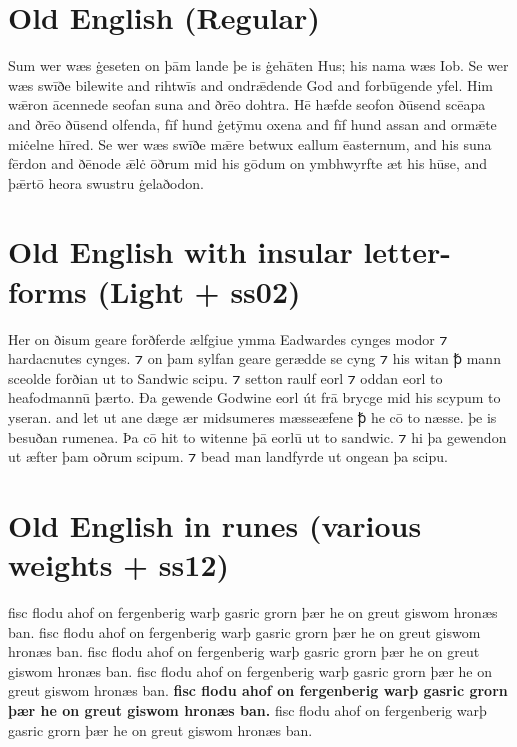 \documentclass[12pt,letterpaper,openany]{book}
\begin{document}
\section{Old English (Regular)}

{\large Sum wer wæs ġeseten on þām lande þe is ġehāten Hus; his nama wæs Iob. Se wer wæs swīðe bilewite and rihtwīs and ondrǣdende God and forbūgende yfel. Him wǣron ācennede seofan suna and ðrēo dohtra. Hē hæfde seofon ðūsend scēapa and ðrēo ðūsend olfenda, fīf hund ġetȳmu oxena and fīf hund assan and ormǣte miċelne hīred. Se wer wæs swīðe mǣre betwux eallum ēasternum, and his suna fērdon and ðēnode ǣlċ ōðrum mid his gōdum on ymbhwyrfte æt his hūse, and þǣrtō heora swustru ġelaðodon.}

\section{Old English with insular letter-forms (Light + ss02)}

{\large\light{}Her on ðisum geare forðferde ælfgiue ymma Eadwardes cynges modor ⁊ hardacnutes cynges. ⁊ on þam sylfan geare gerædde se cyng ⁊ his witan ꝥ mann sceolde forðian ut to Sandwic scipu. ⁊ setton raulf eorl ⁊ oddan eorl to heafodmannū þærto. Ða gewende Godwine eorl út frā brycge mid his scypum to yseran. and let ut ane dæge ær midsumeres mæsseæfene ꝥ he cō to næsse. þe is besuðan rumenea. Þa cō hit to witenne þā eorlū ut to sandwic. ⁊ hi þa gewendon ut æfter þam oðrum scipum. ⁊ bead man landfyrde ut ongean þa scipu.}

\section{Old English in runes (various weights + ss12)}

{\extralight{} fisc flodu ahof on fergenberig warþ gasric grorn þær he on greut giswom hronæs ban.
\light{} fisc flodu ahof on fergenberig warþ gasric grorn þær he on greut giswom hronæs ban.
\medium{} fisc flodu ahof on fergenberig warþ gasric grorn þær he on greut giswom hronæs ban.
\semibold{} fisc flodu ahof on fergenberig warþ gasric grorn þær he on greut giswom hronæs ban.
\textbf{fisc flodu ahof on fergenberig warþ gasric grorn þær he on greut giswom hronæs ban.}
\extrabold{} fisc flodu ahof on fergenberig warþ gasric grorn þær he on greut giswom hronæs ban.}
\end{document}
